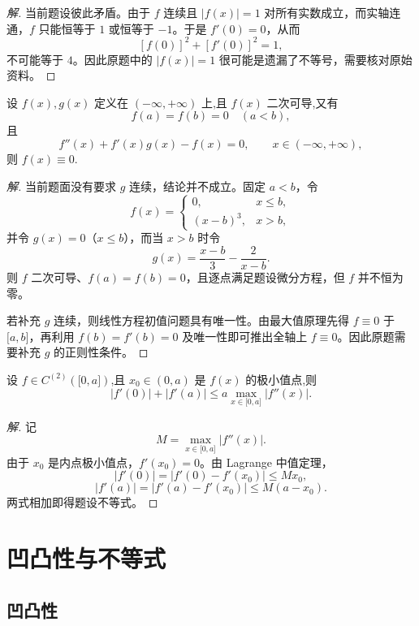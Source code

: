 \documentclass[../../数学分析培优讲义(答案版).tex]{subfiles}
\begin{document}
\begin{proof}[解]
当前题设彼此矛盾。由于 $f$ 连续且 $|f(x)|=1$ 对所有实数成立，而实轴连通，$f$ 只能恒等于 $1$ 或恒等于 $-1$。于是 $f'(0)=0$，从而
\[
    [f(0)]^2+[f'(0)]^2=1,
\]
不可能等于 $4$。因此原题中的 $|f(x)|=1$ 很可能是遗漏了不等号，需要核对原始资料。
\end{proof}

\begin{example}
设 $f(x),g(x)$ 定义在 $(-\infty,+\infty)$ 上,且 $f(x)$ 二次可导,又有
\[
    f(a)=f(b)=0\quad(a<b),
\]
且
\[
    f''(x)+f'(x)g(x)-f(x)=0,
    \qquad x\in(-\infty,+\infty),
\]
则 $f(x)\equiv0$.
\end{example}

\begin{proof}[解]
当前题面没有要求 $g$ 连续，结论并不成立。固定 $a<b$，令
\[
    f(x)=
    \begin{cases}
        0, & x\leq b,\\
        (x-b)^3, & x>b,
    \end{cases}
\]
并令 $g(x)=0$（$x\leq b$），而当 $x>b$ 时令
\[
    g(x)=\dfrac{x-b}{3}-\dfrac{2}{x-b}.
\]
则 $f$ 二次可导、$f(a)=f(b)=0$，且逐点满足题设微分方程，但 $f$ 并不恒为零。

若补充 $g$ 连续，则线性方程初值问题具有唯一性。由最大值原理先得 $f\equiv0$ 于 $\lbrack a,b\rbrack$，再利用 $f(b)=f'(b)=0$ 及唯一性即可推出全轴上 $f\equiv0$。因此原题需要补充 $g$ 的正则性条件。
\end{proof}

\begin{example}
设 $f\in C^{(2)}(\lbrack 0,a\rbrack)$,且 $x_0\in(0,a)$ 是 $f(x)$ 的极小值点,则
\[
    |f'(0)|+|f'(a)|
    \leq a\max\limits_{x\in\lbrack 0,a\rbrack}|f''(x)|.
\]
\end{example}

\begin{proof}[解]
记
\[
    M=\max\limits_{x\in\lbrack0,a\rbrack}|f''(x)|.
\]
由于 $x_0$ 是内点极小值点，$f'(x_0)=0$。由 Lagrange 中值定理，
\[
    |f'(0)|=|f'(0)-f'(x_0)|\leq Mx_0,
\]
\[
    |f'(a)|=|f'(a)-f'(x_0)|\leq M(a-x_0).
\]
两式相加即得题设不等式。
\end{proof}

\newpage

\section{凹凸性与不等式}

\subsection{凹凸性}
\end{document}
